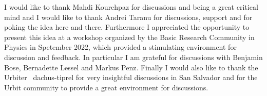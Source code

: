 \begin{acknowledgements}

I would like to thank Mahdi Kourehpaz for discussions and being a great critical mind and I would like to thank Andrei Taranu for discussions, support and for poking the idea here and there. Furthermore I appreciated the opportunity to present this idea at a workshop organized by the Basic Research Community in Physics in Spetember 2022, which provided a stimulating environment for discussion and feedback. In particular I am grateful for discussions with Benjamin Bose, Bernadette Lessel and Markus Penz. Finally I would also like to thank the Urbiter ~dachus-tiprel for very insightful discussions in San Salvador and for the Urbit community to provide a great environment for discussions.

\end{acknowledgements}